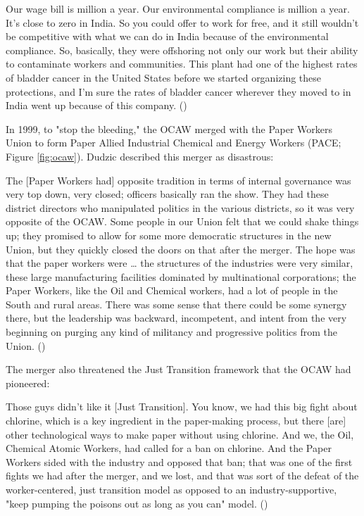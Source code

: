 \documentclass[12pt]{article}
\renewenvironment{quote}
  {\list{}{\leftmargin=\parindent\rightmargin=0pt}%
   \item\relax}
  {\endlist}
\begin{document}
\begin{quote}
Our wage bill is  million a year. Our environmental compliance is  million a year. It's close to zero in India. So you could offer to work for free, and it still wouldn't be competitive with what we can do in India because of the environmental compliance. So, basically, they were offshoring not only our work but their ability to contaminate workers and communities. This plant had one of the highest rates of bladder cancer in the United States before we started organizing these protections, and I'm sure the rates of bladder cancer wherever they moved to in India went up because of this company. (\citeyear{dudzicInterview2024})
\end{quote}

In 1999, to "stop the bleeding," the OCAW merged with the Paper Workers Union to form Paper Allied Industrial Chemical and Energy Workers (PACE; Figure \ref{fig:ocaw}). Dudzic described this merger as disastrous:

\begin{quote}
The [Paper Workers had] opposite tradition in terms of internal governance was very top down, very closed; officers basically ran the show. They had these district directors who manipulated politics in the various districts, so it was very opposite of the OCAW. Some people in our Union felt that we could shake things up; they promised to allow for some more democratic structures in the new Union, but they quickly closed the doors on that after the merger. The hope was that the paper workers were … the structures of the industries were very similar, these large manufacturing facilities dominated by multinational corporations; the Paper Workers, like the Oil and Chemical workers, had a lot of people in the South and rural areas. There was some sense that there could be some synergy there, but the leadership was backward, incompetent, and intent from the very beginning on purging any kind of militancy and progressive politics from the Union. (\citeyear{dudzicInterview2024})
\end{quote}

The merger also threatened the Just Transition framework that the OCAW had pioneered:

\begin{quote}
Those guys didn't like it [Just Transition]. You know, we had this big fight about chlorine, which is a key ingredient in the paper-making process, but there [are] other technological ways to make paper without using chlorine. And we, the Oil, Chemical Atomic Workers, had called for a ban on chlorine. And the Paper Workers sided with the industry and opposed that ban; that was one of the first fights we had after the merger, and we lost, and that was sort of the defeat of the worker-centered, just transition model as opposed to an industry-supportive, "keep pumping the poisons out as long as you can" model. (\citeyear{dudzicInterview2024})
\end{quote}
\end{document}
